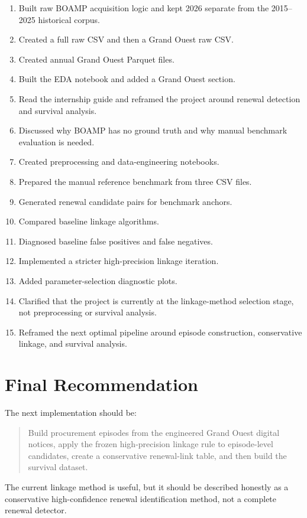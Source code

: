 \documentclass[11pt,a4paper]{article}
\begin{document}
\begin{enumerate}
  \item Built raw BOAMP acquisition logic and kept 2026 separate from the 2015--2025 historical corpus.
  \item Created a full raw CSV and then a Grand Ouest raw CSV.
  \item Created annual Grand Ouest Parquet files.
  \item Built the EDA notebook and added a Grand Ouest section.
  \item Read the internship guide and reframed the project around renewal detection and survival analysis.
  \item Discussed why BOAMP has no ground truth and why manual benchmark evaluation is needed.
  \item Created preprocessing and data-engineering notebooks.
  \item Prepared the manual reference benchmark from three CSV files.
  \item Generated renewal candidate pairs for benchmark anchors.
  \item Compared baseline linkage algorithms.
  \item Diagnosed baseline false positives and false negatives.
  \item Implemented a stricter high-precision linkage iteration.
  \item Added parameter-selection diagnostic plots.
  \item Clarified that the project is currently at the linkage-method selection stage, not preprocessing or survival analysis.
  \item Reframed the next optimal pipeline around episode construction, conservative linkage, and survival analysis.
\end{enumerate}

\section*{Final Recommendation}

The next implementation should be:

\begin{quote}
Build procurement episodes from the engineered Grand Ouest digital notices, apply the frozen high-precision linkage rule to episode-level candidates, create a conservative renewal-link table, and then build the survival dataset.
\end{quote}

The current linkage method is useful, but it should be described honestly as a conservative high-confidence renewal identification method, not a complete renewal detector.
\end{document}
